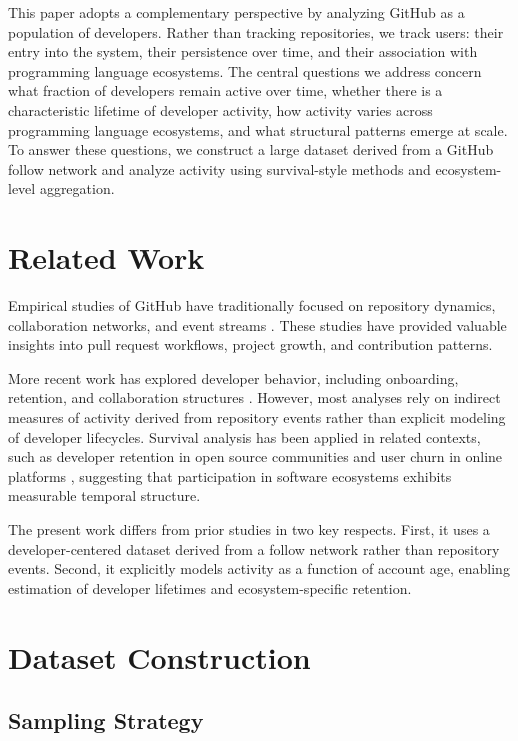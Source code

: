 \documentclass[12pt,a4paper]{article}
\begin{document}
This paper adopts a complementary perspective by analyzing GitHub as a population of developers. Rather than tracking repositories, we track users: their entry into the system, their persistence over time, and their association with programming language ecosystems. The central questions we address concern what fraction of developers remain active over time, whether there is a characteristic lifetime of developer activity, how activity varies across programming language ecosystems, and what structural patterns emerge at scale. To answer these questions, we construct a large dataset derived from a GitHub follow network and analyze activity using survival-style methods and ecosystem-level aggregation.

\section{Related Work}

Empirical studies of GitHub have traditionally focused on repository dynamics, collaboration networks, and event streams \citep{kalliamvakou2014promises, gousios2014ghtorrent}. These studies have provided valuable insights into pull request workflows, project growth, and contribution patterns.

More recent work has explored developer behavior, including onboarding, retention, and collaboration structures \citep{zhou2016information, joblin2017classifying}. However, most analyses rely on indirect measures of activity derived from repository events rather than explicit modeling of developer lifecycles. Survival analysis has been applied in related contexts, such as developer retention in open source communities and user churn in online platforms \citep{vasilescu2015gender}, suggesting that participation in software ecosystems exhibits measurable temporal structure.

The present work differs from prior studies in two key respects. First, it uses a developer-centered dataset derived from a follow network rather than repository events. Second, it explicitly models activity as a function of account age, enabling estimation of developer lifetimes and ecosystem-specific retention.

\section{Dataset Construction}

\subsection{Sampling Strategy}
\end{document}
